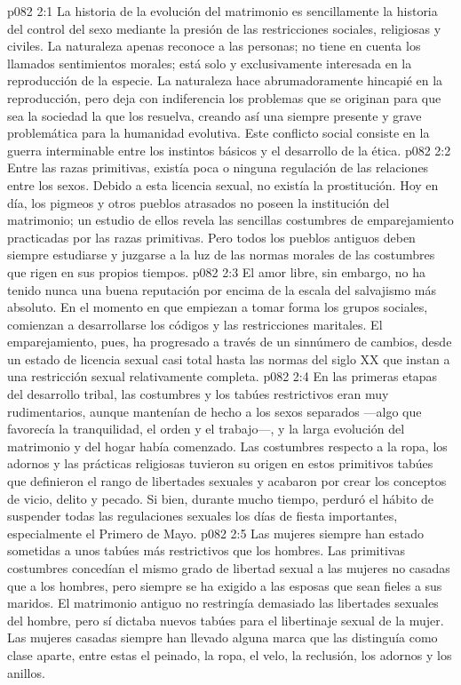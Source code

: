 \vs p082 2:1 La historia de la evolución del matrimonio es sencillamente la historia del control del sexo mediante la presión de las restricciones sociales, religiosas y civiles. La naturaleza apenas reconoce a las personas; no tiene en cuenta los llamados sentimientos morales; está solo y exclusivamente interesada en la reproducción de la especie. La naturaleza hace abrumadoramente hincapié en la reproducción, pero deja con indiferencia los problemas que se originan para que sea la sociedad la que los resuelva, creando así una siempre presente y grave problemática para la humanidad evolutiva. Este conflicto social consiste en la guerra interminable entre los instintos básicos y el desarrollo de la ética.
\vs p082 2:2 \pc Entre las razas primitivas, existía poca o ninguna regulación de las relaciones entre los sexos. Debido a esta licencia sexual, no existía la prostitución. Hoy en día, los pigmeos y otros pueblos atrasados no poseen la institución del matrimonio; un estudio de ellos revela las sencillas costumbres de emparejamiento practicadas por las razas primitivas. Pero todos los pueblos antiguos deben siempre estudiarse y juzgarse a la luz de las normas morales de las costumbres que rigen en sus propios tiempos.
\vs p082 2:3 El amor libre, sin embargo, no ha tenido nunca una buena reputación por encima de la escala del salvajismo más absoluto. En el momento en que empiezan a tomar forma los grupos sociales, comienzan a desarrollarse los códigos y las restricciones maritales. El emparejamiento, pues, ha progresado a través de un sinnúmero de cambios, desde un estado de licencia sexual casi total hasta las normas del siglo XX que instan a una restricción sexual relativamente completa.
\vs p082 2:4 En las primeras etapas del desarrollo tribal, las costumbres y los tabúes restrictivos eran muy rudimentarios, aunque mantenían de hecho a los sexos separados ---algo que favorecía la tranquilidad, el orden y el trabajo---, y la larga evolución del matrimonio y del hogar había comenzado. Las costumbres respecto a la ropa, los adornos y las prácticas religiosas tuvieron su origen en estos primitivos tabúes que definieron el rango de libertades sexuales y acabaron por crear los conceptos de vicio, delito y pecado. Si bien, durante mucho tiempo, perduró el hábito de suspender todas las regulaciones sexuales los días de fiesta importantes, especialmente el Primero de Mayo.
\vs p082 2:5 \pc Las mujeres siempre han estado sometidas a unos tabúes más restrictivos que los hombres. Las primitivas costumbres concedían el mismo grado de libertad sexual a las mujeres no casadas que a los hombres, pero siempre se ha exigido a las esposas que sean fieles a sus maridos. El matrimonio antiguo no restringía demasiado las libertades sexuales del hombre, pero sí dictaba nuevos tabúes para el libertinaje sexual de la mujer. Las mujeres casadas siempre han llevado alguna marca que las distinguía como clase aparte, entre estas el peinado, la ropa, el velo, la reclusión, los adornos y los anillos.
